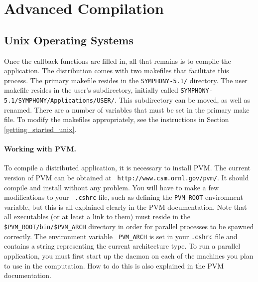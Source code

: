 \section{Advanced Compilation}
\label{advanced-compilation}

\subsection{Unix Operating Systems}

Once the callback functions are filled in, all that remains is to compile the
application. The distribution comes with two makefiles that facilitate this
process. The primary makefile resides in the {\tt SYMPHONY-5.1/} directory.
The user makefile resides in the user's subdirectory, initially called
\texttt{SYMPHONY-5.1/SYMPHONY/Applications/USER/}. This subdirectory can be 
moved, as well as renamed. There are a number of variables that must be set in 
the primary make file. To modify the makefiles appropriately, see the 
instructions in Section \ref{getting_started_unix}.

\paragraph{Working with PVM.}
\label{PVM}
To compile a distributed application, it is necessary to install PVM.
The current version of PVM can be obtained at {\tt
{}
{http://www.csm.ornl.gov/pvm/}}. It should compile and install without
any problem. You will have to make a few modifications to your {\tt
.cshrc} file, such as defining the {\tt PVM\_ROOT} environment
variable, but this is all explained clearly in the PVM documentation.
Note that all executables (or at least a link to them) must reside in
the {\tt \$PVM\_ROOT/bin/\$PVM\_ARCH} directory in order for parallel
processes to be spawned correctly. The environment variable {\tt
PVM\_ARCH} is set in your {\tt .cshrc} file and contains a string
representing the current architecture type. To run a parallel
application, you must first start up the daemon on each of the
machines you plan to use in the computation. How to do this is also
explained in the PVM documentation.

